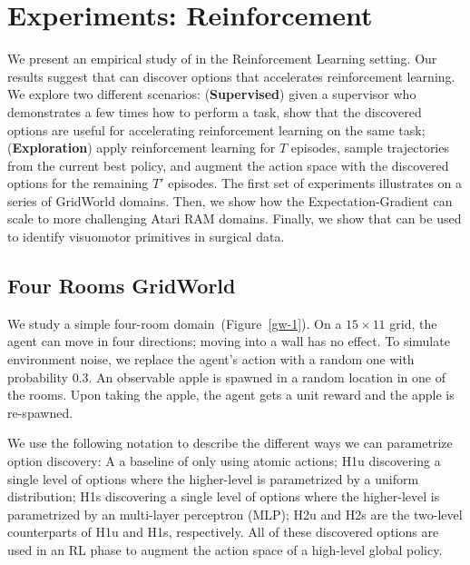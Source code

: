 \section{Experiments: Reinforcement}
We present an empirical study of \alg in the Reinforcement Learning setting. Our results suggest that \alg can discover options that accelerates reinforcement learning.
We explore two different scenarios: (\textbf{Supervised}) given a supervisor who demonstrates a few times how to perform a task, show that the discovered options are useful for accelerating reinforcement learning on the same task; (\textbf{Exploration}) apply reinforcement learning for $T$ episodes, sample trajectories from the current best policy, and augment the action space with the discovered options for the remaining $T'$ episodes. 
The first set of experiments illustrates \alg on a series of GridWorld domains.
Then, we show how the Expectation-Gradient can scale to more challenging Atari RAM domains.
Finally, we show that \alg can be used to identify visuomotor primitives in surgical data.

\subsection*{Four Rooms GridWorld \label{exp:gw-four-rooms}}
We study a simple four-room domain~(Figure~\ref{gw-1}). On a $15\times11$ grid, the agent can move in four directions; moving into a wall has no effect. To simulate environment noise, we replace the agent's action with a random one with probability $0.3$. An observable apple is spawned in a random location in one of the rooms. Upon taking the apple, the agent gets a unit reward and the apple is re-spawned.

We use the following notation to describe the different ways we can parametrize option discovery: \textsf{A} a baseline of only using atomic actions; \textsf{H1u} discovering a single level of options where the higher-level is parametrized by a uniform distribution; \textsf{H1s} discovering a single level of options where the higher-level is parametrized by an multi-layer perceptron (MLP); \textsf{H2u} and \textsf{H2s} are the two-level counterparts of \textsf{H1u} and \textsf{H1s}, respectively. All of these discovered options are used in an RL phase to augment the action space of a high-level global policy.

